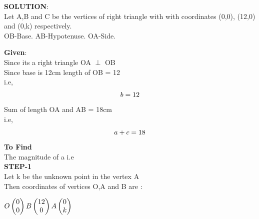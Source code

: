 \documentclass[10pt,a4paper]{report}
\begin{document}
\begin{multicols}{2}
\raggedright \textbf{SOLUTION}:\vspace{2mm}\\
Let A,B and C be the vertices of right triangle with with coordinates (0,0), (12,0) and (0,k) respectively.\vspace{2mm}\\
OB-Base.
AB-Hypotenuse.
OA-Side.\\\vspace{2mm}
\raggedright \textbf{Given}:\vspace{2mm}\\
Since its a right triangle OA $\perp$ OB \\\vspace{2mm}
Since base is 12cm length of OB = 12  \\i.e,\\
\begin{equation}
b= 12 \vspace{2mm}
\end{equation}
Sum of length OA and AB = 18cm \\ i.e,\\
\begin{equation}
a + c= 18 \vspace{2mm}
\end{equation}
\textbf{To Find}\vspace{2mm}\\
The magnitude of a \hspace{2mm} i.e \\ \vspace{2mm}
\textbf{STEP-1}\vspace{2mm}\\
Let k be the unknown point in the vertex A \vspace{2mm}\\
Then coordinates of vertices  O,A and B are :\vspace{2mm}\\
\begin{center}$
 O \begin{pmatrix}
0 \\
0 
\end{pmatrix} 
\vspace{1mm}
B\begin{pmatrix}
12 \\
0 
\end{pmatrix} 
\vspace{1mm}
A\begin{pmatrix}
0 \\
k 
\end{pmatrix} 
\vspace{1mm}$
\end{center}


\end{multicols}
\end{document}
